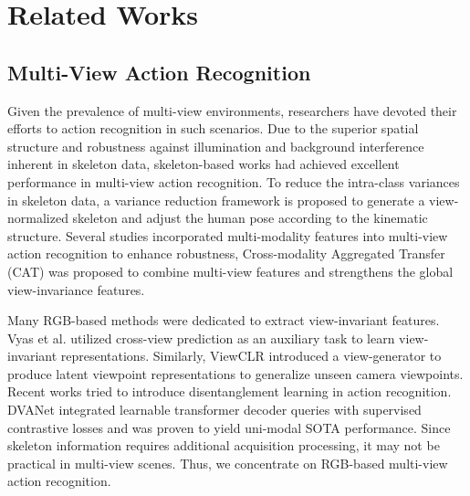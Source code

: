 \section{Related Works}
\subsection{Multi-View Action Recognition}

Given the prevalence of multi-view environments, researchers have devoted their efforts to action recognition in such scenarios.
Due to the superior spatial structure and robustness against illumination and background interference inherent in skeleton data, skeleton-based works \cite{Pan2023ViewNormalized,chi2022infogcn} had achieved excellent performance in multi-view action recognition.
To reduce the intra-class variances in skeleton data, a variance reduction framework \cite{Pan2023ViewNormalized} is proposed to generate a view-normalized skeleton and adjust the human pose according to the kinematic structure.
Several studies incorporated multi-modality features into multi-view action recognition to enhance robustness, Cross-modality Aggregated Transfer (CAT) \cite{xu2021cross} was proposed to combine multi-view features and strengthens the global view-invariance features. 

Many RGB-based methods were dedicated to extract view-invariant features.
Vyas et al. \cite{vyas2020multi} utilized cross-view prediction as an auxiliary task to learn view-invariant representations. 
Similarly, ViewCLR \cite{das2023viewclr} introduced a view-generator to produce latent viewpoint representations to generalize unseen camera viewpoints. 
Recent works \cite{liu2023dual,siddiqui2024dvanet} tried to introduce disentanglement learning in action recognition.
DVANet \cite{siddiqui2024dvanet} integrated learnable transformer decoder queries with supervised contrastive losses and was proven to yield uni-modal SOTA performance.
Since skeleton information requires additional acquisition processing, it may not be practical in multi-view scenes. Thus, we concentrate on RGB-based multi-view action recognition.

